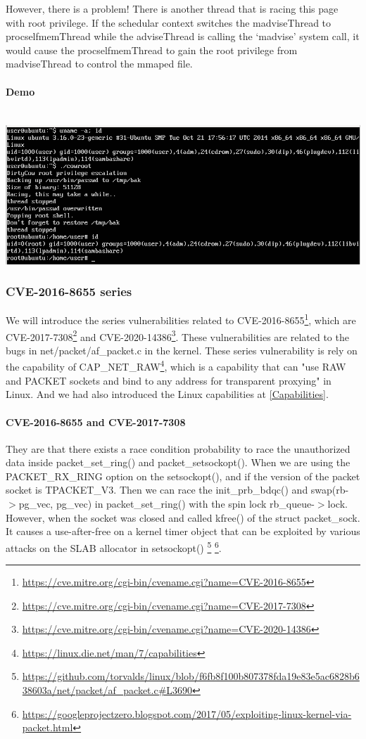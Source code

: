 However, there is a problem! There is another thread that is racing this page with root
privilege. If the schedular context switches the madviseThread to procselfmemThread while
the adviseThread is calling the `madvise' system call, it would cause the
procselfmemThread to gain the root privilege from madviseThread to control the mmaped file.

\paragraph{Demo}\mbox{}\\
\includegraphics[width=\textwidth]{src/Screenshot_2021-12-26_05-14-58.png}
\label{qemumachine}

\subsubsection{CVE-2016-8655 series}
We will introduce the series vulnerabilities related to CVE-2016-8655\footnote{
    \url{https://cve.mitre.org/cgi-bin/cvename.cgi?name=CVE-2016-8655}}, which are
CVE-2017-7308\footnote{\url{https://cve.mitre.org/cgi-bin/cvename.cgi?name=CVE-2017-7308}}
and CVE-2020-14386\footnote{\url{https://cve.mitre.org/cgi-bin/cvename.cgi?name=CVE-2020-14386}}.
These vulnerabilities are related to the bugs in net/packet/af\_packet.c in the kernel.
These series vulnerability is rely on the capability of CAP\_NET\_RAW\footnote{\url{https://linux.die.net/man/7/capabilities}},
which is a capability that can "use RAW and PACKET sockets and bind to
any address for transparent proxying" in Linux. And we had also introduced the Linux
capabilities at \ref{Capabilities}.

\paragraph{CVE-2016-8655 and CVE-2017-7308} They are that there exists a race condition probability to
race the unauthorized data inside packet\_set\_ring() and packet\_setsockopt().
When we are using the PACKET\_RX\_RING option on the setsockopt(), and if the
version of the packet socket is TPACKET\_V3. Then we can race the init\_prb\_bdqc()
and swap(rb-$>$pg\_vec, pg\_vec) in packet\_set\_ring() with the spin lock rb\_queue-$>$lock.
However, when the socket was closed and called kfree() of the struct packet\_sock.
It causes a use-after-free on a kernel timer object that can be exploited
by various attacks on the SLAB allocator in setsockopt()
\footnote{\url{https://github.com/torvalds/linux/blob/f6fb8f100b807378fda19e83e5ac6828b638603a/net/packet/af\_packet.c\#L3690}}
\footnote{\url{https://googleprojectzero.blogspot.com/2017/05/exploiting-linux-kernel-via-packet.html}}.


